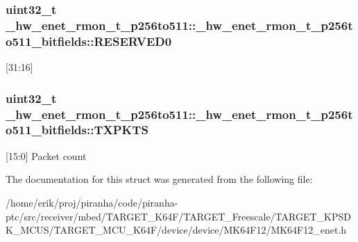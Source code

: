 \subsubsection[{\texorpdfstring{R\+E\+S\+E\+R\+V\+E\+D0}{RESERVED0}}]{\setlength{\rightskip}{0pt plus 5cm}uint32\+\_\+t \+\_\+hw\+\_\+enet\+\_\+rmon\+\_\+t\+\_\+p256to511\+::\+\_\+hw\+\_\+enet\+\_\+rmon\+\_\+t\+\_\+p256to511\+\_\+bitfields\+::\+R\+E\+S\+E\+R\+V\+E\+D0}\hypertarget{struct__hw__enet__rmon__t__p256to511_1_1__hw__enet__rmon__t__p256to511__bitfields_af55c6612f1bfaedf15f45ddb3b535ed1}{}\label{struct__hw__enet__rmon__t__p256to511_1_1__hw__enet__rmon__t__p256to511__bitfields_af55c6612f1bfaedf15f45ddb3b535ed1}
\mbox{[}31\+:16\mbox{]} 
\subsubsection[{\texorpdfstring{T\+X\+P\+K\+TS}{TXPKTS}}]{\setlength{\rightskip}{0pt plus 5cm}uint32\+\_\+t \+\_\+hw\+\_\+enet\+\_\+rmon\+\_\+t\+\_\+p256to511\+::\+\_\+hw\+\_\+enet\+\_\+rmon\+\_\+t\+\_\+p256to511\+\_\+bitfields\+::\+T\+X\+P\+K\+TS}\hypertarget{struct__hw__enet__rmon__t__p256to511_1_1__hw__enet__rmon__t__p256to511__bitfields_ad674f4584805e429c5d9359c139ebf59}{}\label{struct__hw__enet__rmon__t__p256to511_1_1__hw__enet__rmon__t__p256to511__bitfields_ad674f4584805e429c5d9359c139ebf59}
\mbox{[}15\+:0\mbox{]} Packet count 

The documentation for this struct was generated from the following file\+:\begin{DoxyCompactItemize}
\item 
/home/erik/proj/piranha/code/piranha-\/ptc/src/receiver/mbed/\+T\+A\+R\+G\+E\+T\+\_\+\+K64\+F/\+T\+A\+R\+G\+E\+T\+\_\+\+Freescale/\+T\+A\+R\+G\+E\+T\+\_\+\+K\+P\+S\+D\+K\+\_\+\+M\+C\+U\+S/\+T\+A\+R\+G\+E\+T\+\_\+\+M\+C\+U\+\_\+\+K64\+F/device/device/\+M\+K64\+F12/M\+K64\+F12\+\_\+enet.\+h\end{DoxyCompactItemize}
